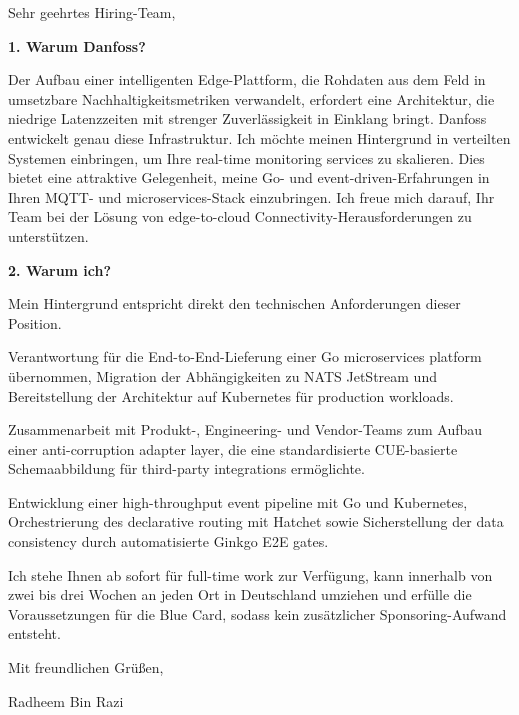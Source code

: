 \documentclass[11pt,a4paper]{coverletter}
\begin{document}
\opening{Sehr geehrtes Hiring-Team,}

\vspace{8pt}\noindent\textbf{1. Warum Danfoss?}\par\vspace{3pt}

Der Aufbau einer intelligenten Edge-Plattform, die Rohdaten aus dem Feld in umsetzbare Nachhaltigkeitsmetriken verwandelt, erfordert eine Architektur, die niedrige Latenzzeiten mit strenger Zuverlässigkeit in Einklang bringt. Danfoss entwickelt genau diese Infrastruktur. Ich möchte meinen Hintergrund in verteilten Systemen einbringen, um Ihre real-time monitoring services zu skalieren. Dies bietet eine attraktive Gelegenheit, meine Go- und event-driven-Erfahrungen in Ihren MQTT- und microservices-Stack einzubringen. Ich freue mich darauf, Ihr Team bei der Lösung von edge-to-cloud Connectivity-Herausforderungen zu unterstützen.

\vspace{8pt}\noindent\textbf{2. Warum ich?}\par\vspace{3pt}

Mein Hintergrund entspricht direkt den technischen Anforderungen dieser Position.

\bullets

  \item Verantwortung für die End-to-End-Lieferung einer Go microservices platform übernommen, Migration der Abhängigkeiten zu NATS JetStream und Bereitstellung der Architektur auf Kubernetes für production workloads.

  \item Zusammenarbeit mit Produkt-, Engineering- und Vendor-Teams zum Aufbau einer anti-corruption adapter layer, die eine standardisierte CUE-basierte Schemaabbildung für third-party integrations ermöglichte.

  \item Entwicklung einer high-throughput event pipeline mit Go und Kubernetes, Orchestrierung des declarative routing mit Hatchet sowie Sicherstellung der data consistency durch automatisierte Ginkgo E2E gates.

\bulletsend

Ich stehe Ihnen ab sofort für full-time work zur Verfügung, kann innerhalb von zwei bis drei Wochen an jeden Ort in Deutschland umziehen und erfülle die Voraussetzungen für die Blue Card, sodass kein zusätzlicher Sponsoring-Aufwand entsteht.

\closing{Mit freundlichen Grüßen,}{Radheem Bin Razi}
\end{document}
